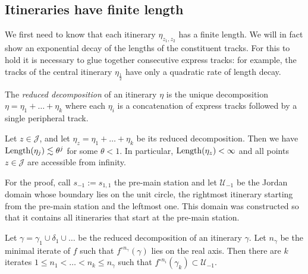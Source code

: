 \subsection{Itineraries have finite length}
We first need to know that each itinerary $\eta_{z_1,z_2}$ has a finite length. We will in fact show an exponential decay of the lengths of the constituent tracks. For this to hold it is necessary to glue together consecutive express tracks: for example, the tracks of the central itinerary $\eta_{\frac 12}$ have only a quadratic rate of length decay.

\begin{definition}
	The \emph{reduced decomposition} of an itinerary $\eta$ is the unique decomposition $\eta=\eta_1+\dots+\eta_k$ where each $\eta_i$ is a concatenation of express tracks followed by a single peripheral track.
\end{definition}

\begin{comment}
The following definition is used in the proof of \cref{prop:finite-length}.
\begin{definition}
	The \emph{shadow} of a station $s$ is the set of all terminals $z\in \mathcal J$ that are the endpoints of itineraries starting at $s$.
\end{definition}

Using this definition, we claim:
\end{comment}

\begin{proposition} \label{prop:finite-length}
	Let $z \in \mathcal J$, and let $\eta_z=\eta_1+\dots+\eta_k$ be its reduced decomposition. Then we have $\operatorname{Length}(\eta_j)\lesssim \theta^j$ for some $\theta < 1$. In particular, $\operatorname{Length}(\eta_z)<\infty$ and all points $z\mathcal \in \mathcal J$ are accessible from infinity.
\end{proposition}

For the proof, call $s_{-1}:=s_{1,1}$ the pre-main station and let $\mathcal U_{-1}$ be the Jordan domain whose boundary lies on the unit circle, the rightmost itinerary starting from the pre-main station and the leftmost one. This domain was constructed so that it contains all itineraries that start at the pre-main station.

\begin{lemma} \label{lemma-enough-visits-of-premain_station}
	Let $\gamma = \gamma_1 \cup \delta_1 \cup \dots $ be the reduced decomposition of an itinerary $\gamma$. Let $n_\gamma$ be the minimal iterate of $f$ such that $f^{\circ {n_\gamma}}(\gamma)$ lies on the real axis. Then there are $k$ iterates $1  \leq n_1 < \dots < n_k \leq n_\gamma$ such that $f^{\circ {n_i}}(\gamma_k) \subset \mathcal U_{-1}$.
\end{lemma}

